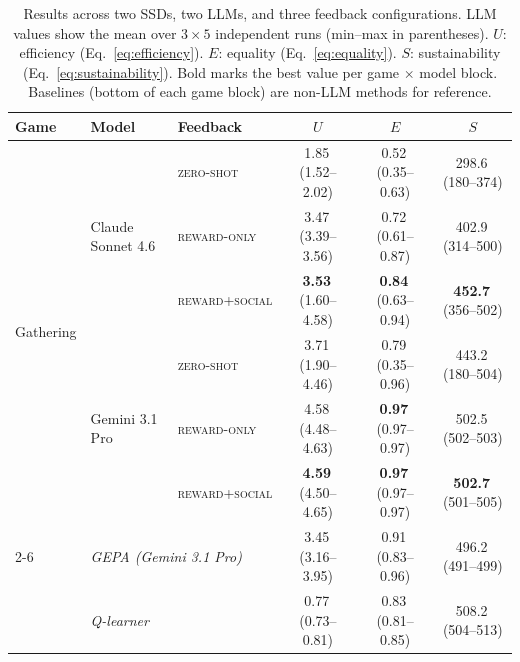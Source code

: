 \documentclass{nextgame2026} %
\begin{document}
\begin{table}[t]
\centering
\caption{Results across two SSDs, two LLMs, and three feedback configurations.
LLM values show the mean over $3 \times 5$ independent runs (min--max in parentheses).
$U$: efficiency (Eq.~\ref{eq:efficiency}).
$E$: equality (Eq.~\ref{eq:equality}).
$S$: sustainability (Eq.~\ref{eq:sustainability}).
Bold marks the best value per game$\,\times\,$model block.
Baselines (bottom of each game block) are non-LLM methods for reference.}
\label{tab:main}
\footnotesize
\begin{tabular}{@{}ll l ccc @{}}
\toprule
\textbf{Game} & \textbf{Model} & \textbf{Feedback} & $U$ & $E$ & $S$  \\
\midrule
\multirow{6}{*}{Gathering}
  & \multirow{3}{*}{Claude Sonnet 4.6}
  & \textsc{zero-shot}                         & 1.85\,{\scriptsize(1.52--2.02)}  & 0.52\,{\scriptsize(0.35--0.63)}  & 298.6\,{\scriptsize(180--374)}   \\
  & & \textsc{reward-only}           & 3.47\,{\scriptsize(3.39--3.56)}  & 0.72\,{\scriptsize(0.61--0.87)}  & 402.9\,{\scriptsize(314--500)}   \\
  & & \textsc{reward+social}       & \textbf{3.53}\,{\scriptsize(1.60--4.58)}  & \textbf{0.84}\,{\scriptsize(0.63--0.94)}  & \textbf{452.7}\,{\scriptsize(356--502)}   \\
  \cmidrule{2-6}
  & \multirow{3}{*}{Gemini 3.1 Pro}
  & \textsc{zero-shot}                         & 3.71\,{\scriptsize(1.90--4.46)}  & 0.79\,{\scriptsize(0.35--0.96)}  & 443.2\,{\scriptsize(180--504)}   \\
  & & \textsc{reward-only}           & 4.58\,{\scriptsize(4.48--4.63)}  & \textbf{0.97}\,{\scriptsize(0.97--0.97)}  & 502.5\,{\scriptsize(502--503)}   \\
  & & \textsc{reward+social}       & \textbf{4.59}\,{\scriptsize(4.50--4.65)}  & \textbf{0.97}\,{\scriptsize(0.97--0.97)}  & \textbf{502.7}\,{\scriptsize(501--505)}   \\
  \cmidrule{2-6}
  & \multicolumn{2}{l}{\color{gray}\emph{GEPA (Gemini 3.1 Pro)}}
                                    & \color{gray}3.45\,{\scriptsize(3.16--3.95)}  & \color{gray}0.91\,{\scriptsize(0.83--0.96)}  & \color{gray}496.2\,{\scriptsize(491--499)}   \\
  & \multicolumn{2}{l}{\color{gray}\emph{Q-learner}}
                                    & \color{gray}0.77\,{\scriptsize(0.73--0.81)}  & \color{gray}0.83\,{\scriptsize(0.81--0.85)}  & \color{gray}508.2\,{\scriptsize(504--513)}   \\

\end{tabular}
\end{table}
\end{document}
